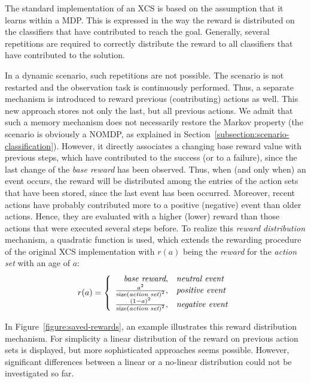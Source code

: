 The standard implementation of an XCS is based on the assumption that it learns within a MDP. This is expressed in the way the reward is distributed on the classifiers that have contributed to reach the goal. Generally, several repetitions are required to correctly distribute the reward to all classifiers that have contributed to the solution.

In a dynamic scenario, such repetitions are not possible. The scenario is not restarted and the observation task is continuously performed. Thus, a separate mechanism is introduced to reward previous (contributing) actions as well. This new approach stores not only the last, but all previous actions. We admit that such a memory mechanism does not necessarily restore the Markov property (the scenario is obviously a NOMDP, as explained in Section~\ref{subsection:scenario-classification}). However, it directly associates a changing base reward value with previous steps, which have contributed to the success (or to a failure), since the last change of the \emph{base reward} has been observed. %
Thus, when (and only when) an event occurs, the reward will be distributed among the entries of the action sets that have been stored, since the last event has been occurred. Moreover, recent actions have probably contributed more to a positive (negative) event than older actions. Hence, they are evaluated with a higher (lower) reward than those actions that were executed several steps before. To realize this \emph{reward distribution} mechanism, a quadratic function is used, which extends the rewarding procedure of the original XCS implementation with $r(a)$ being the \emph{reward} for the \emph{action set} with an age of $a$:
$$ %
	r(a) = 
	\left\{ \begin{array}{r@{,\quad}l}
		\emph{base reward} & \mbox{\emph{neutral event}}\\  	
		\frac{{a}^{2}}{{\mathrm{size(\emph{action set})}}^{2}} & \mbox{\emph{positive event}} \\
  		\frac{{(1 - a)}^{2}}{{\mathrm{size(\emph{action set})}}^{2}} & \mbox{\emph{negative event}}
  	\end{array} \right.
$$ %

In Figure~\ref{figure:saved-rewards}, an example illustrates this reward distribution mechanism. For simplicity a linear distribution of the reward on previous action sets is displayed, but more sophisticated approaches seems possible. However, significant differences between a linear or a no-linear distribution could not be investigated so far. 

